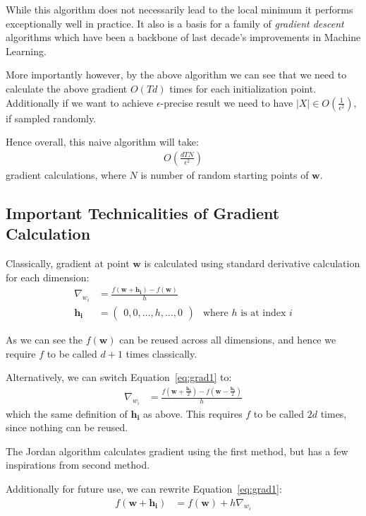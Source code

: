 \documentclass{article}
\begin{document}
While this algorithm does not necessarily lead to the local minimum it performs exceptionally well in practice. It also is a basis for a family of
\textit{gradient descent} algorithms which have been a backbone of last decade's improvements in Machine Learning.

More importantly however, by the above algorithm we can see that we need to calculate the above gradient $O(Td)$ times for each initialization point.
Additionally if we want to achieve $\epsilon$-precise result we need to have $|X| \in O(\frac{1}{\epsilon^2})$, if sampled randomly.

Hence overall, this naive algorithm will take:
\begin{align}
    O(\frac{dTN}{\epsilon^2})
\end{align}
gradient calculations, where $N$ is number of random starting points of $\pmb{w}$.

\subsection{Important Technicalities of Gradient Calculation}
\label{subsec:tech-grad}

Classically, gradient at point $\pmb{w}$ is calculated using standard derivative calculation for each dimension:
\begin{align}
    \label{eq:grad1}
    \nabla_{w_i} &= \frac{f(\pmb{w} + \pmb{h_i}) - f(\pmb{w})}{h} \\
    \pmb{h_i} &= \begin{pmatrix}
        0, 0, \hdots, h, \hdots, 0
    \end{pmatrix} & \text{where $h$ is at index $i$}
\end{align}

As we can see the $f(\pmb{w})$ can be reused across all dimensions, and hence we require $f$ to be called $d + 1$ times classically.

Alternatively, we can switch Equation~\ref{eq:grad1} to:
\begin{align}
    \label{eq:grad2}
    \nabla_{w_i} &= \frac{f(\pmb{w} + \frac{\pmb{h_i}}{2}) - f(\pmb{w} - \frac{\pmb{h_i}}{2})}{h}
\end{align}
which the same definition of $\pmb{h_i}$ as above. This requires $f$ to be called $2d$ times, since nothing can be reused.

The Jordan algorithm calculates gradient using the first method, but has a few inspirations from second method.

Additionally for future use, we can rewrite Equation~\ref{eq:grad1}:
\begin{align}
    \label{eq:grad-lemma}
    f(\pmb{w} + \pmb{h_i}) &= f(\pmb{w}) + h\nabla_{w_i}
\end{align}
\end{document}
